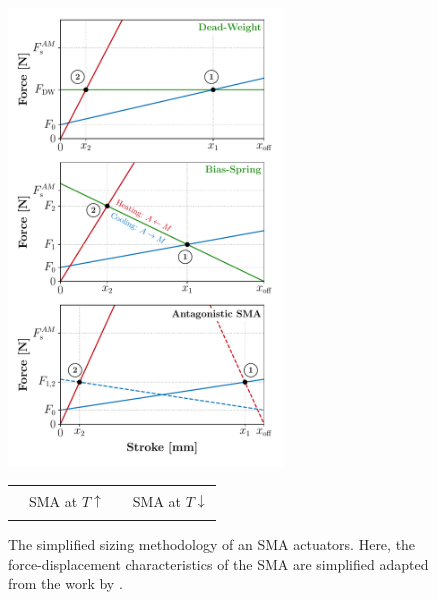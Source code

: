 \begin{figure}[hbt!]
    \centering
    \includegraphics[width=0.65\textwidth]{images/chap2/simplied-sma-bias-all-wp.pdf}

    \begin{tabular}{l@{ }l l@{ }l}
      {\color{myred} \rule[2pt]{10pt}{0.5mm} } & {\footnotesize SMA at $T\uparrow$} & {\color{myblue} \rule[2pt]{10pt}{0.5mm} } & {\footnotesize SMA at $T\downarrow$}\\
    \end{tabular}
    \caption[The simplified sizing methodology of an SMA actuators]{The simplified sizing methodology of an SMA actuators. Here, the force-displacement characteristics of the SMA are simplified adapted from the work by \cite{dragoniDesignDevelopmentAdvanced2021}.}
    \label{fig:simplied-sma-bias-spring-wp}
\end{figure}

